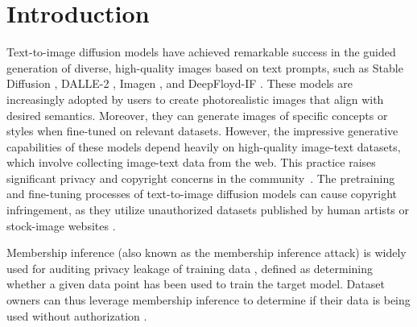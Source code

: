 \section{Introduction}

Text-to-image diffusion models have achieved remarkable success in the guided generation of diverse, high-quality images based on text prompts, 
such as Stable Diffusion \cite{rombach2022high, podell2023sdxl}, DALLE-2 \cite{ramesh2022hierarchical}, Imagen \cite{saharia2022photorealistic}, and DeepFloyd-IF \cite{DeepFloyd_IF}. 
These models are increasingly adopted by users to create photorealistic images that align with desired semantics.
Moreover, they can generate images of specific concepts \cite{Pokemon-Blip}  or styles  \cite{Wikiart} when fine-tuned on relevant datasets.
However, the impressive generative capabilities of these models depend heavily on high-quality image-text datasets, which involve collecting image-text data from the web. 
This practice raises significant privacy and copyright concerns in the community~\cite{carlini2023extracting,Generative_AI_Has}. 
The pretraining and fine-tuning processes of text-to-image diffusion models can cause copyright infringement, as they utilize unauthorized datasets published by human artists or stock-image websites 
\cite{bbc2022Art, cnn2022AI, washington2022AI, Reuters2023getty, Reuters2023Lawsuits}. 

Membership inference (also known as the membership inference attack) is widely used for auditing privacy leakage of training data 
\cite{shokri2017membership, carlini2022membership}, defined as determining whether a given data point has been used to train the target model. 
Dataset owners can thus leverage membership inference to determine if their data is being used without authorization \cite{miao2021audio,dealcala2024my}.


